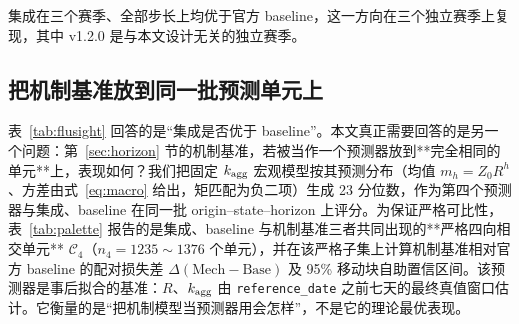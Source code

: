 \documentclass[11pt,a4paper]{article}
\begin{document}
\begin{table}[htbp]
\centering\small
\caption{FluSight 的 final-vintage 外部审计：三个锁定赛季}\label{tab:flusight}
\end{table}

集成在三个赛季、全部步长上均优于官方 baseline，这一方向在三个独立赛季上复现，其中 v1.2.0 是与本文设计无关的独立赛季。

\subsection{把机制基准放到同一批预测单元上}

表~\ref{tab:flusight} 回答的是“集成是否优于 baseline”。本文真正需要回答的是另一个问题：第~\ref{sec:horizon} 节的机制基准，若被当作一个预测器放到**完全相同的单元**上，表现如何？我们把固定 $k_{\rm agg}$ 宏观模型按其预测分布（均值 $m_h=Z_0R^h$、方差由式~\eqref{eq:macro} 给出，矩匹配为负二项）生成 23 分位数，作为第四个预测器与集成、baseline 在同一批 origin--state--horizon 上评分。为保证严格可比性，表~\ref{tab:palette} 报告的是集成、baseline 与机制基准三者共同出现的**严格四向相交单元** $\mathcal C_4$（$n_4=1235\sim 1376$ 个单元），并在该严格子集上计算机制基准相对官方 baseline 的配对损失差 $\Delta(\text{Mech}-\text{Base})$ 及 95\% 移动块自助置信区间。该预测器是事后拟合的基准：$R$、$k_{\rm agg}$ 由 \texttt{reference\_date} 之前七天的最终真值窗口估计。它衡量的是“把机制模型当预测器用会怎样”，不是它的理论最优表现。
\end{document}
